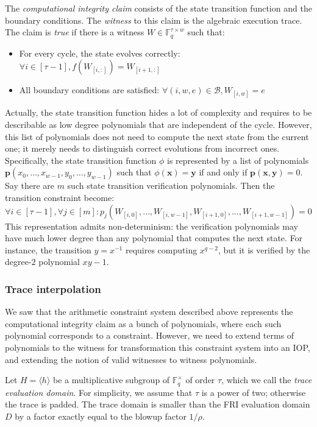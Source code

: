 \documentclass[../../book]{subfiles}
\begin{document}
The \emph{computational integrity claim} consists of the state transition function and the boundary conditions. The \emph{witness} to this claim is the algebraic execution trace. The claim is \emph{true} if there is a witness $W\in \mathbb{F}_q^{\tau \times w}$ such that:
\begin{itemize}
  \item For every cycle, the state evolves correctly: $\forall i\in [\tau-1], f(W_{[i, :]})=W_{[i+1, :]}$
  \item All boundary conditions are satisfied: $\forall (i, w, e)\in \mathcal{B}, W_{[i, w]}=e$
\end{itemize}
Actually, the state transition function hides a lot of complexity and requires to be describable as low degree polynomials that are independent of the cycle.
However, this list of polynomials does not need to compute the next state from the current one; it merely needs to distinguish correct evolutions from incorrect ones. Specifically, the state transition function $\phi$ is represented by a list of polynomials $\mathbf{p}(x_0,\ldots,x_{w-1}, y_0,\ldots,y_{w-1})$ such that $\phi(\mathbf{x})=\mathbf{y}$ if and only if $\mathbf{p}(\mathbf{x},\mathbf{y})=0$. Say there are $m$ such state transition verification polynomials. Then the transition constraint become:
\begin{equation*}
  \forall i\in[\tau-1],\forall j\in[m]: p_j(W_{[i, 0]},\ldots,W_{[i, w-1]},W_{[i+1, 0]},\ldots,W_{[i+1, w-1]})=0
\end{equation*}
This representation admits non-determinism: the verification polynomials may have much lower degree than any polynomial that computes the next state. For instance, the transition $y = x^{-1}$ requires computing $x^{q-2}$, but it is verified by the degree-$2$ polynomial $xy - 1$.

\subsubsection{Trace interpolation}
We saw that the arithmetic constraint system described above represents the computational integrity claim as a bunch of polynomials, where each such polynomial corresponds to a constraint. However, we need to extend terms of polynomials to the witness for transformation this constraint system into an IOP, and extending the notion of valid witnesses to witness polynomials.

Let $H = \langle h \rangle$ be a multiplicative subgroup of $\mathbb{F}_q^{\times}$ of order $\tau$, which we call the \emph{trace evaluation domain}. For simplicity, we assume that $\tau$ is a power of two; otherwise the trace is padded. The trace domain is smaller than the FRI evaluation domain $D$ by a factor exactly equal to the blowup factor $1/\rho$.
\end{document}
